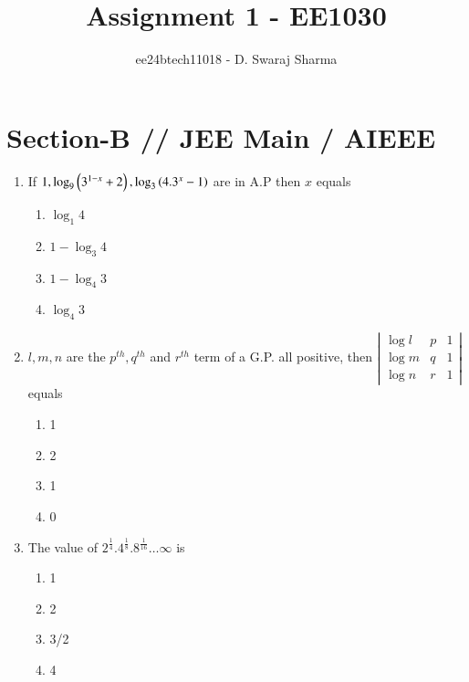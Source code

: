 \documentclass[journal,12pt,twocolumn]{IEEEtran}
\theoremstyle{remark}
\begin{document}

\vspace{3cm}

\title{Assignment 1 - EE1030}
\author{ee24btech11018 - D. Swaraj Sharma}
\maketitle
\newpage
\bigskip

\renewcommand{\thefigure}{\theenumi}
\renewcommand{\thetable}{\theenumi}

\section*{\textbf{Section-B} // \textbf{JEE Main} / \textbf{AIEEE}}

\begin{enumerate}[label={\arabic*.}]


\item {If $ 1, \log_9 \left(3^{1-x} +2\right), \log_3 \left(4.3^x -1\right)$ are in A.P then $x$ equals}
{\hfill{}}
\begin{enumerate}[label={\brak{\alph*}}]
\item  {$\log_1 4$}
 \item {$1-\log_3 4$}
 \item {$1-\log_4 3$}
 \item {$\log_4 3$}
\end{enumerate}
\item {$l, m, n$ are the $p^{th}, q^{th}$ and $r^{th}$ term of a G.P. all positive, then $\left|\begin{matrix} \log l & p & 1 \\ \log m & q & 1 \\ \log n & r & 1 \end{matrix}\right|$ equals}
{\hfill{}} 
\begin{enumerate}[label={\brak{\alph*}}]
\item{1}
\item{2}
\item{1}
\item{0}
\end{enumerate}

\item {The value of $2^{\frac{1}{4}} . 4^{\frac{1}{8}} . 8^{\frac{1}{16}} \ldots \infty$ is}
{\hfill{}} 
\begin{enumerate}[label={\brak{\alph*}}]
\item  {1}
\item  {2}
\item  {3/2}
\item  {4}
\end{enumerate}


\end{enumerate}
\end{document}
